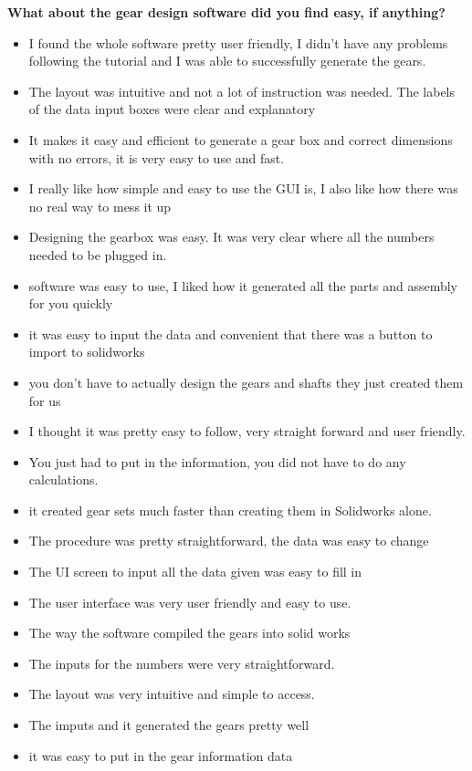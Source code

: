 \noindent\textbf{What about the gear design software did you find easy, if anything?}
\begin{itemize}
    \item I found the whole software pretty user friendly, I didn't have any problems following the tutorial and I was able to successfully generate the gears.
    \item The layout was intuitive and not a lot of instruction was needed. The labels of the data input boxes were clear and explanatory
    \item It makes it easy and efficient to generate a gear box and correct dimensions with no errors, it is very easy to use and fast.
    \item I really like how simple and easy to use the GUI is, I also like how there was no real way to mess it up
    \item Designing the gearbox was easy. It was very clear where all the numbers needed to be plugged in.
    \item software was easy to use, I liked how it generated all the parts and assembly for you quickly
    \item it was easy to input the data and convenient that there was a button to import to solidworks
    \item you don't have to actually design the gears and shafts they just created them for us
    \item I thought it was pretty easy to follow, very straight forward and user friendly.
    \item You just had to put in the information, you did not have to do any calculations.
    \item it created gear sets much faster than creating them in Solidworks alone.
    \item The procedure was pretty straightforward, the data was easy to change
    \item The UI screen to input all the data given was easy to fill in
    \item The user interface was very user friendly and easy to use.
    \item The way the software compiled the gears into solid works
    \item The inputs for the numbers were very straightforward.
    \item The layout was very intuitive and simple to access.
    \item The imputs and it generated the gears pretty well
    \item it was easy to put in the gear information data

\end{itemize}
